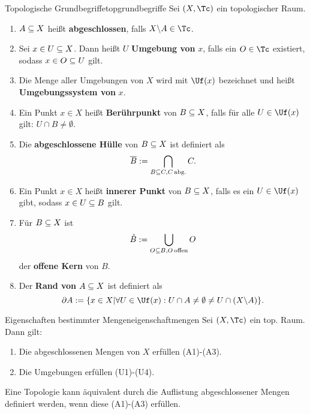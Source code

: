 \begin{definition}{Topologische Grundbegriffe}{topgrundbegriffe}
Sei $(X, \Tc)$ ein topologischer Raum.
\begin{enumerate}
\item $A \subseteq X$ heißt \textbf{abgeschlossen}, falls $X \exc A \in \Tc$.
\item Sei $x \in U \subseteq X$. Dann heißt $U$ \textbf{Umgebung von} $x$, falls ein $O \in \Tc$ existiert, sodass $x \in O \subseteq U$ gilt.
\item Die Menge aller Umgebungen von $X$ wird mit $\Uf (x)$ bezeichnet und heißt \textbf{Umgebungssystem von} $x$. 
\item Ein Punkt $x \in X$ heißt \textbf{Berührpunkt} von $B \subseteq X$, falls für alle $U \in \Uf(x)$ gilt: $U \cap B \neq \emptyset$.
\item Die \textbf{abgeschlossene Hülle} von $B \subseteq X$ ist definiert als 
\begin{equation}
\overline{B} := \bigcap_{B \subseteq C, C \, \text{abg.}} C.
\end{equation}
\item Ein Punkt $x \in X$ heißt \textbf{innerer Punkt} von $B \subseteq X$, falls es ein $U \in \Uf(x)$ gibt, sodass $x \in U \subseteq B$ gilt.
\item Für $B \subseteq X$ ist 
\begin{equation}
\mathring{B} := \bigcup_{O \subseteq B, O \, \text{offen}} O
\end{equation}
der \textbf{offene Kern} von $B$.
\item Der \textbf{Rand von} $A \subseteq X$ ist definiert als
\begin{equation}
\partial A:= \{x \in X|\forall U \in \Uf(x): U \cap A \neq \emptyset \neq U \cap (X \exc A)\}.
\end{equation}
\end{enumerate}
\end{definition}
\begin{satz}{Eigenschaften bestimmter Mengen}{eigenschaftmengen}
Sei $(X, \Tc)$ ein top. Raum. Dann gilt:
\begin{enumerate}
\item Die abgeschlossenen Mengen von $X$ erfüllen (A1)-(A3).
\item Die Umgebungen erfüllen (U1)-(U4).
\end{enumerate}
\end{satz}
\begin{bemerkung}
Eine Topologie kann äquivalent durch die Auflistung abgeschlossener Mengen definiert werden, wenn diese (A1)-(A3) erfüllen.
\end{bemerkung}
